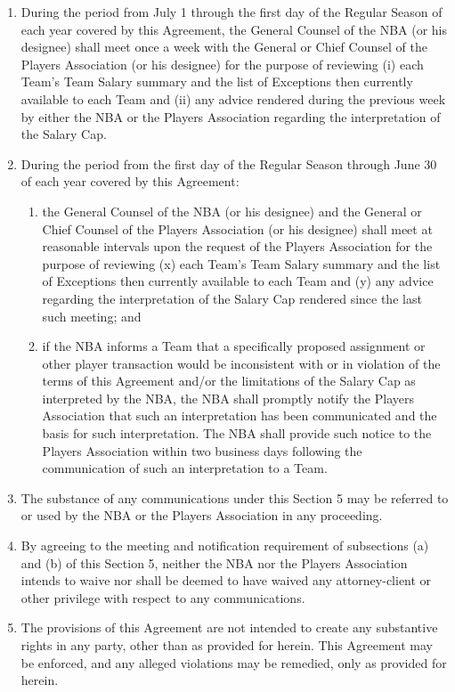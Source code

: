 \documentclass[
]{book}
\providecommand{\tightlist}{%
  \setlength{\itemsep}{0pt}\setlength{\parskip}{0pt}}
\begin{document}
\begin{enumerate}
\def\labelenumi{(\alph{enumi})}
\tightlist
\item
  During the period from July 1 through the first day of the Regular Season of each year covered by this Agreement, the General Counsel of the NBA (or his designee) shall meet once a week with the General or Chief Counsel of the Players Association (or his designee) for the purpose of reviewing (i) each Team's Team Salary summary and the list of Exceptions then currently available to each Team and (ii) any advice rendered during the previous week by either the NBA or the Players Association regarding the interpretation of the Salary Cap.
\item
  During the period from the first day of the Regular Season through June 30 of each year covered by this Agreement:

  \begin{enumerate}
  \def\labelenumii{(\roman{enumii})}
  \tightlist
  \item
    the General Counsel of the NBA (or his designee) and the General or Chief Counsel of the Players Association (or his designee) shall meet at reasonable intervals upon the request of the Players Association for the purpose of reviewing (x) each Team's Team Salary summary and the list of Exceptions then currently available to each Team and (y) any advice regarding the interpretation of the Salary Cap rendered since the last such meeting; and
  \item
    if the NBA informs a Team that a specifically proposed assignment or other player transaction would be inconsistent with or in violation of the terms of this Agreement and/or the limitations of the Salary Cap as interpreted by the NBA, the NBA shall promptly notify the Players Association that such an interpretation has been communicated and the basis for such interpretation. The NBA shall provide such notice to the Players Association within two business days following the communication of such an interpretation to a Team.
  \end{enumerate}
\item
  The substance of any communications under this Section 5 may be referred to or used by the NBA or the Players Association in any proceeding.
\item
  By agreeing to the meeting and notification requirement of subsections (a) and (b) of this Section 5, neither the NBA nor the Players Association intends to waive nor shall be deemed to have waived any attorney-client or other privilege with respect to any communications.
\item
  The provisions of this Agreement are not intended to create any substantive rights in any party, other than as provided for herein. This Agreement may be enforced, and any alleged violations may be remedied, only as provided for herein.
\end{enumerate}
\end{document}
